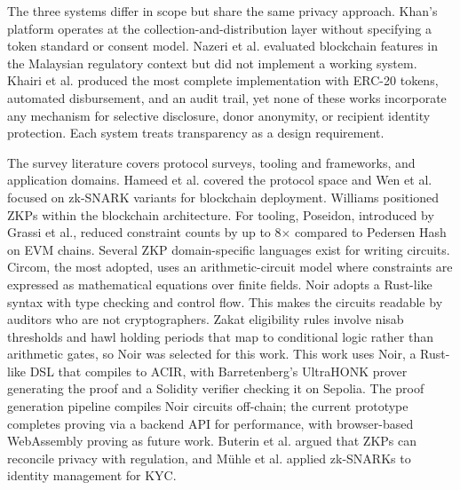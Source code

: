 \documentclass[conference]{IEEEtran}
\begin{document}
The three systems differ in scope but share the same privacy approach\cite{b_zakat_acm}\cite{b_zakat_malaysia}\cite{b_zakat_transparency}. Khan's platform\cite{b_zakat_acm} operates at the collection-and-distribution layer without specifying a token standard or consent model. Nazeri et al.\cite{b_zakat_malaysia} evaluated blockchain features in the Malaysian regulatory context but did not implement a working system. Khairi et al.\cite{b_zakat_transparency} produced the most complete implementation with ERC-20 tokens, automated disbursement, and an audit trail, yet none of these works incorporate any mechanism for selective disclosure, donor anonymity, or recipient identity protection\cite{b_zkp_circuits}\cite{b_zkfi}. Each system treats transparency as a design requirement\cite{b_zakat_acm}\cite{b_zakat_malaysia}\cite{b_zakat_transparency}.

The survey literature covers protocol surveys, tooling and frameworks, and application domains\cite{b_zkp_circuits}\cite{b_zkp_vuln}\cite{b_zkp_cacm}. Hameed et al.\cite{b_zkp_blockchain} covered the protocol space and Wen et al.\cite{b_zkp_vuln} focused on zk-SNARK variants for blockchain deployment. Williams\cite{b_zkp_cacm} positioned ZKPs within the blockchain architecture. For tooling, Poseidon, introduced by Grassi et al.\cite{b_poseidon}, reduced constraint counts by up to 8$\times$ compared to Pedersen Hash on EVM chains. Several ZKP domain-specific languages exist for writing circuits\cite{b_noir}\cite{b_zkp_circuits}. Circom, the most adopted, uses an arithmetic-circuit model where constraints are expressed as mathematical equations over finite fields\cite{b_zkp_vuln}. Noir adopts a Rust-like syntax with type checking and control flow\cite{b_noir}. This makes the circuits readable by auditors who are not cryptographers\cite{b_noir}\cite{b_zkp_financial}. Zakat eligibility rules involve nisab thresholds and hawl holding periods that map to conditional logic rather than arithmetic gates, so Noir was selected for this work\cite{b_noir}. This work uses Noir\cite{b_noir}, a Rust-like DSL that compiles to ACIR, with Barretenberg's UltraHONK prover\cite{b_aztec} generating the proof and a Solidity verifier checking it on Sepolia. The proof generation pipeline compiles Noir circuits off-chain; the current prototype completes proving via a backend API for performance, with browser-based WebAssembly proving as future work\cite{b_pwa_survey}. Buterin et al.\cite{b_zkfi} argued that ZKPs can reconcile privacy with regulation, and M\"{u}hle et al.\cite{b_zkp_idm} applied zk-SNARKs to identity management for KYC.
\end{document}
